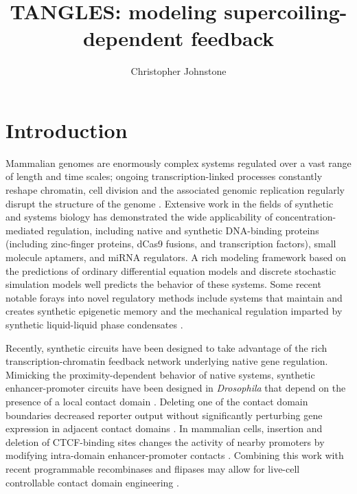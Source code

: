 \documentclass[11pt]{article}
\title{TANGLES: modeling supercoiling-dependent feedback}
\author{Christopher Johnstone}
\date{}
\begin{document}
\maketitle

\section{Introduction}
Mammalian genomes are enormously complex systems regulated over a vast range of length and time scales; ongoing transcription-linked processes constantly reshape chromatin, cell division and the associated genomic replication regularly disrupt the structure of the genome \parencite{johnstoneUnderstandingEngineeringChromatin2020}. Extensive work in the fields of synthetic and systems biology has demonstrated the wide applicability of concentration-mediated regulation, including native and synthetic DNA-binding proteins (including zinc-finger proteins, dCas9 fusions, and transcription factors), small molecule aptamers, and miRNA regulators.
A rich modeling framework based on the predictions of ordinary differential equation models and discrete stochastic simulation models well predicts the behavior of these systems.
Some recent notable forays into novel regulatory methods include systems that maintain and creates synthetic epigenetic memory \parencite{parkEngineeringEpigeneticRegulation2019} and the mechanical regulation imparted by synthetic liquid-liquid phase condensates \parencite{shinLiquidNuclearCondensates2018}.

Recently, synthetic circuits have been designed to take advantage of the rich transcription-chromatin feedback network underlying native gene regulation. Mimicking the proximity-dependent behavior of native systems, synthetic enhancer-promoter circuits have been designed in \textit{Drosophila} that depend on the presence of a local contact domain \parencite{yokoshiVisualizingRoleBoundary2020}. Deleting one of the contact domain boundaries decreased reporter output without significantly perturbing gene expression in adjacent contact domains \parencite{yokoshiVisualizingRoleBoundary2020}.
In mammalian cells, insertion and deletion of CTCF-binding sites changes the activity of nearby promoters by modifying intra-domain enhancer-promoter contacts \parencite{jiaTandemCTCFSites2020}. Combining this work with recent programmable recombinases and flipases may allow for live-cell controllable contact domain engineering \parencite{guoCRISPRInversionCTCF2015,weinbergHighperformanceChemicalLightinducible2019}.
\end{document}
